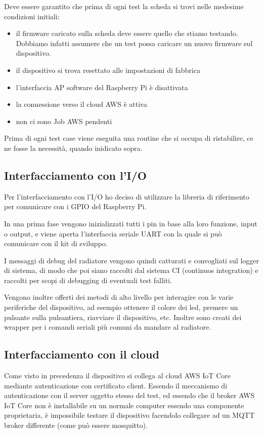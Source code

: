 \documentclass[12pt,a4paper,twoside,titlepage]{book}
\begin{document}
Deve essere garantito che prima di ogni test la scheda si trovi nelle medesime
condizioni initiali:

\begin{itemize}
    \item il firmware caricato sulla scheda deve essere quello che stiamo testando.
        Dobbiamo infatti assumere che un test possa caricare un nuovo firmware sul
        dispositivo.
    \item il dispositivo si trova resettato alle impostazioni di fabbrica
    \item l'interfaccia AP software del Raspberry Pi è disattivata
    \item la connessione verso il cloud AWS è attiva
    \item non ci sono Job AWS pendenti
\end{itemize}

Prima di ogni test case viene eseguita una routine che si occupa di ristabilire,
ce ne fosse la necessità, quando inidicato sopra.

\subsection{Interfacciamento con l'I/O}

Per l'interfacciamento con l'I/O ho deciso di utilizzare la libreria di riferimento
per comunicare con i GPIO del Raspberry Pi.

In una prima fase vengono inizializzati tutti i pin in base alla loro funzione, input
o output, e viene aperta l'interfaccia seriale UART con la quale si può comunicare con
il kit di sviluppo.

I messaggi di debug del radiatore vengono quindi catturati e convogliati sul logger
di sistema, di modo che poi siano raccolti dal sistema CI (continuos integration)
e raccolti per scopi di debugging di eventuali test falliti.

Vengono inoltre offerti dei metodi di alto livello per interagire con le varie
periferiche del dispositivo, ad esempio ottenere il colore dei led, premere un
pulsante sulla pulsantiera, riavviare il dispositivo, etc.
Inoltre sono creati dei wrapper per i comandi seriali più comuni da mandare al
radiatore.

\subsection{Interfacciamento con il cloud}

Come visto in precedenza il dispositivo si collega al cloud AWS IoT Core mediante 
autenticazione con certificato client. Essendo il meccanismo di autenticazione con il 
server oggetto stesso del test, ed essendo che il broker AWS IoT Core non è installabile 
su un normale computer essendo una componente proprietaria, è impossibile testare il 
dispositivo facendolo collegare ad un MQTT broker differente (come può essere mosquitto). 
\end{document}
